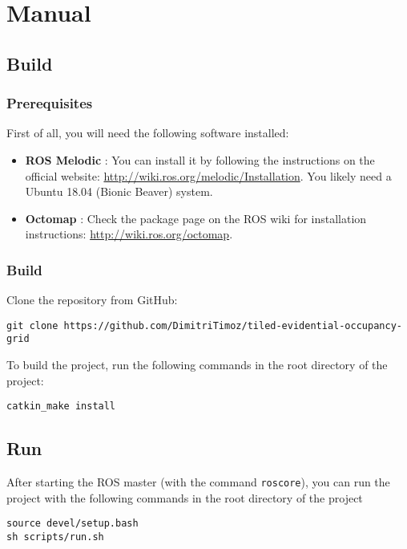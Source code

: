 
\chapter{Manual}

\section{Build}

\subsection{Prerequisites}

First of all, you will need the following software installed:
\begin{itemize}
    \item \textbf{ROS Melodic} : You can install it by following the instructions on the official website: \url{http://wiki.ros.org/melodic/Installation}. You likely need a Ubuntu 18.04 (Bionic Beaver) system.
    \item \textbf{Octomap} : Check the package page on the ROS wiki for installation instructions: \url{http://wiki.ros.org/octomap}.
\end{itemize}

\subsection{Build}

Clone the repository from GitHub:
\begin{verbatim}
git clone https://github.com/DimitriTimoz/tiled-evidential-occupancy-grid
\end{verbatim}

To build the project, run the following commands in the root directory of the project:
\begin{verbatim}
catkin_make install
\end{verbatim}

\section{Run}

After starting the ROS master (with the command \texttt{roscore}), you can run the project with the following commands in the root directory of the project

\begin{verbatim}
source devel/setup.bash
sh scripts/run.sh
\end{verbatim}

